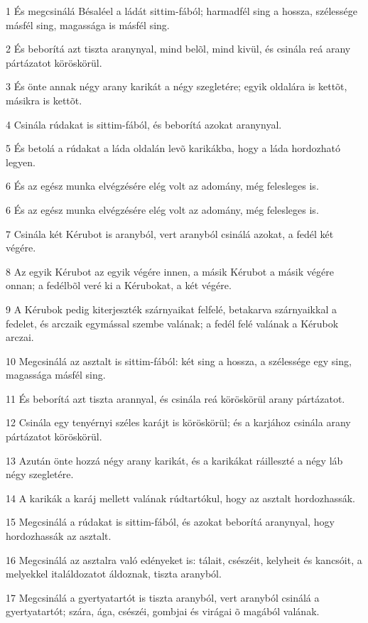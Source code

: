 \par 1 És megcsinálá Bésaléel a ládát sittim-fából; harmadfél sing a hossza, szélessége másfél sing, magassága is másfél sing.
\par 2 És beborítá azt tiszta aranynyal, mind belõl, mind kivül, és csinála reá arany pártázatot köröskörül.
\par 3 És önte annak négy arany karikát a négy szegletére; egyik oldalára is kettõt, másikra is kettõt.
\par 4 Csinála rúdakat is sittim-fából, és beborítá azokat aranynyal.
\par 5 És betolá a rúdakat a láda oldalán levõ karikákba, hogy a láda hordozható legyen.
\par 6 És az egész munka elvégzésére elég volt az adomány, még felesleges is.
\par 6 És az egész munka elvégzésére elég volt az adomány, még felesleges is.
\par 7 Csinála két Kérubot is aranyból, vert aranyból csinálá azokat, a fedél két végére.
\par 8 Az egyik Kérubot az egyik végére innen, a másik Kérubot a másik végére onnan; a fedélbõl veré ki a Kérubokat, a két végére.
\par 9 A Kérubok pedig kiterjeszték szárnyaikat felfelé, betakarva szárnyaikkal a fedelet, és arczaik egymással szembe valának; a fedél felé valának a Kérubok arczai.
\par 10 Megcsinálá az asztalt is sittim-fából: két sing a hossza, a szélessége egy sing, magassága másfél sing.
\par 11 És beborítá azt tiszta arannyal, és csinála reá köröskörül arany pártázatot.
\par 12 Csinála egy tenyérnyi széles karájt is köröskörül; és a karjához csinála arany pártázatot köröskörül.
\par 13 Azután önte hozzá négy arany karikát, és a karikákat ráilleszté a négy láb négy szegletére.
\par 14 A karikák a karáj mellett valának rúdtartókul, hogy az asztalt hordozhassák.
\par 15 Megcsinálá a rúdakat is sittim-fából, és azokat beborítá aranynyal, hogy hordozhassák az asztalt.
\par 16 Megcsinálá az asztalra való edényeket is: tálait, csészéit, kelyheit és kancsóit, a melyekkel italáldozatot áldoznak, tiszta aranyból.
\par 17 Megcsinálá a gyertyatartót is tiszta aranyból, vert aranyból csinálá a gyertyatartót; szára, ága, csészéi, gombjai és virágai õ magából valának.
